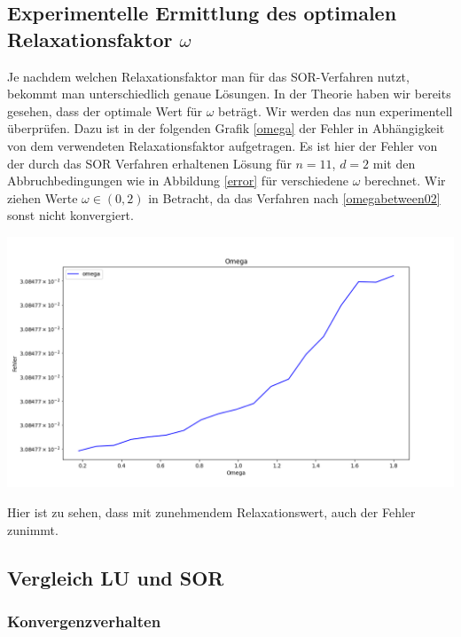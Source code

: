 \documentclass[smallheadings]{scrartcl}
\theoremstyle{definition}
\begin{document}
\subsection{Experimentelle Ermittlung des optimalen Relaxationsfaktor $\omega$}
Je nachdem welchen Relaxationsfaktor man für das SOR-Verfahren nutzt,  bekommt man unterschiedlich genaue Lösungen.  In der Theorie haben wir bereits gesehen, dass der optimale Wert für $\omega$ beträgt.  Wir werden das nun experimentell überprüfen.  Dazu ist in der folgenden Grafik \ref{omega}
 der Fehler in Abhängigkeit von dem verwendeten Relaxationsfaktor aufgetragen.  Es ist hier der Fehler von der durch das SOR Verfahren erhaltenen Lösung für $n=11$, $d=2$ mit den Abbruchbedingungen wie in Abbildung \ref{error} für verschiedene $\omega$ berechnet. Wir ziehen Werte $\omega \in (0,2)$ in Betracht, da das Verfahren nach \ref{omegabetween02} sonst nicht konvergiert.

\begin{minipage}{\textwidth}

 \centering
 \includegraphics[scale = 0.5]{Omega1}
 	\label{omega}

 \end{minipage}
		 
	Hier ist zu sehen, dass mit zunehmendem Relaxationswert, auch der Fehler zunimmt. 
	
		
\subsection{Vergleich LU und SOR}
\subsubsection{Konvergenzverhalten}
\end{document}
